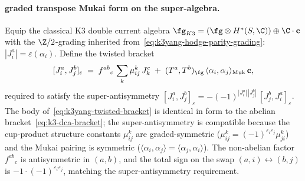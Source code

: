 \paragraph{graded transpose Mukai form on the super-algebra.}
Equip the classical K3 double current algebra
$\fg_{K3} = (\fg \otimes H^*(S, \C)) \oplus \C \cdot \mathbf c$ with
the $\Z/2$-grading inherited
from~\eqref{eq:k3yang-hodge-parity-grading}:
$|J^a_i| = \varepsilon(\alpha_i)$. Define the twisted bracket
\begin{equation}\label{eq:k3yang-twisted-bracket}
 [J^a_i, J^b_j]_{\varepsilon}
 \;=\;
 f^{ab}{}_c\, \sum_k \mu^k_{ij}\, J^c_k
 \;+\;
 (T^a, T^b)_{\fg}\,
 \langle \alpha_i, \alpha_j\rangle_{\mathrm{Muk}}\,
 \mathbf c,
\end{equation}
required to satisfy the super-antisymmetry
$[J^a_i, J^b_j]_{\varepsilon}
 = -(-1)^{|J^a_i|\,|J^b_j|}\,[J^b_j, J^a_i]_{\varepsilon}$.
The body of~\eqref{eq:k3yang-twisted-bracket} is identical in form
to the abelian bracket~\eqref{eq:k3-dca-bracket}; the
super-antisymmetry is compatible because the cup-product structure
constants $\mu^k_{ij}$ are graded-symmetric
($\mu^k_{ij} = (-1)^{\varepsilon_i \varepsilon_j}\mu^k_{ji}$) and
the Mukai pairing is symmetric
($\langle \alpha_i, \alpha_j\rangle
 = \langle \alpha_j, \alpha_i\rangle$).
The non-abelian factor $f^{ab}{}_c$ is antisymmetric in $(a, b)$,
and the total sign on the swap $(a, i) \leftrightarrow (b, j)$ is
$-1 \cdot (-1)^{\varepsilon_i \varepsilon_j}$, matching the
super-antisymmetry requirement.

